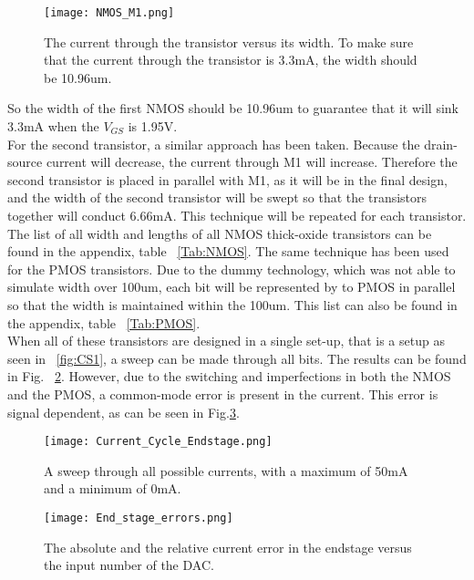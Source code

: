 \begin{figure}[ht!]
\begin{center}
\texttt{[image: NMOS\_M1.png]}
\caption{The current through the transistor versus its width. To make sure that the current through the transistor is 3.3mA, the width should be 10.96um.}
\label{fig:NMOS_Width_Sweep_Result}
\end{center}
\end{figure}
So the width of the first NMOS should be 10.96um to guarantee that it will sink 3.3mA when the $V_{GS}$ is 1.95V.\\
For the second transistor, a similar approach has been taken. Because the drain-source current will decrease, the current through M1 will increase. Therefore the second transistor is placed in parallel with M1, as it will be in the final design, and the width of the second transistor will be swept so that the transistors together will conduct 6.66mA. This technique will be repeated for each transistor. The list of all width and lengths of all NMOS thick-oxide transistors can be found in the appendix, table ~\ref{Tab:NMOS}.
The same technique has been used for the PMOS transistors. Due to the dummy technology, which was not able to simulate width over 100um, each bit will be represented by to PMOS in parallel so that the width is maintained within the 100um. This list can also be found in the appendix, table ~\ref{Tab:PMOS}.\\

When all of these transistors are designed in a single set-up, that is a setup as seen in ~\ref{fig:CS1}, a sweep can be made through all bits. The results can be found in Fig. ~\ref{fig:Final_result}. However, due to the switching and imperfections in both the NMOS and the PMOS, a common-mode error is present in the current. This error is signal dependent, as can be seen in Fig.\ref{fig:Current_error}.
\begin{figure}[ht!]
\begin{center}
\texttt{[image: Current\_Cycle\_Endstage.png]}
\caption{A sweep through all possible currents, with a maximum of 50mA and a minimum of 0mA.}
\label{fig:Final_result}
\end{center}
\end{figure}
\begin{figure}[ht!]
\begin{center}
\texttt{[image: End\_stage\_errors.png]}
\caption{The absolute and the relative current error in the endstage versus the input number of the DAC.}
\label{fig:Current_error}
\end{center}
\end{figure}
